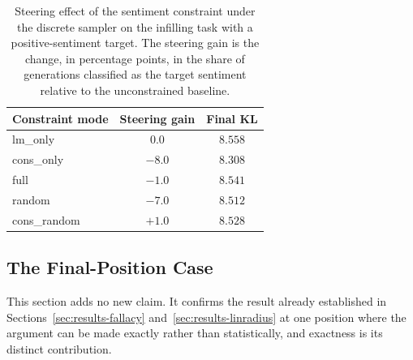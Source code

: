 \begin{table}[t]
    \centering
    \small
    \begin{tabular}{lcc}
        \toprule
        Constraint mode & Steering gain & Final KL \\
        \midrule
        lm\_only & $0.0$ & $8.558$ \\
        cons\_only & $-8.0$ & $8.308$ \\
        full & $-1.0$ & $8.541$ \\
        random & $-7.0$ & $8.512$ \\
        cons\_random & $+1.0$ & $8.528$ \\
        \bottomrule
    \end{tabular}
    \caption[Steering effect of the sentiment constraint, discrete sampler, infilling.]{Steering effect of the sentiment constraint under the discrete sampler on the infilling task with a positive-sentiment target. The steering gain is the change, in percentage points, in the share of generations classified as the target sentiment relative to the unconstrained baseline.}
    \label{tab:constrained}
\end{table}

\subsection{The Final-Position Case}
\label{sec:results-lasttoken}


This section adds no new claim. It confirms the result already established in Sections~\ref{sec:results-fallacy} and~\ref{sec:results-linradius} at one position where the argument can be made exactly rather than statistically, and exactness is its distinct contribution.


